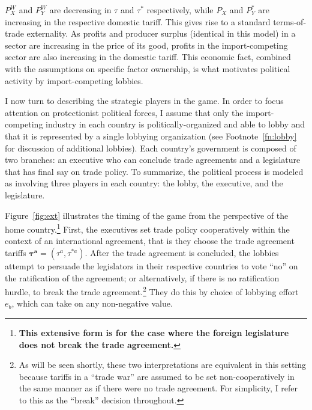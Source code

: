 \documentclass[10pt]{article}
\newcommand{\bta}{\bm{\tau^a}}
\begin{document}
$P_X^W$ and $P_Y^W$ are decreasing in $\tau$ and $\tau^*$ respectively, while $P_X$ and $P_Y^*$ are increasing in the respective domestic tariff. This gives rise to a standard terms-of-trade externality. As profits and producer surplus (identical in this model) in a sector are increasing in the price of its good, profits in the import-competing sector are also increasing in the domestic tariff. This economic fact, combined with the assumptions on specific factor ownership, is what motivates political activity by import-competing lobbies.

I now turn to describing the strategic players in the game. In order to focus attention on protectionist political forces, I assume that only the import-competing industry in each country is politically-organized and able to lobby and that it is represented by a single lobbying organization (see Footnote~\ref{fn:lobby} for discussion of additional lobbies). Each country's government is composed of two branches: an executive who can conclude trade agreements and a legislature that has final say on trade policy. To summarize, the political process is modeled as involving three players in each country: the lobby, the executive, and the legislature.

Figure~\ref{fig:ext} illustrates the timing of the game from the perspective of the home country.\footnote{\textbf{This extensive form is for the case where the foreign legislature does not break the trade agreement.}} First, the executives set trade policy cooperatively within the context of an international agreement, that is they choose the trade agreement tariffs $\bta = \left(\tau^a,\tau^{*a}\right)$. After the trade agreement is concluded, the lobbies attempt to persuade the legislators in their respective countries to vote ``no'' on the ratification of the agreement; or alternatively, if there is no ratification hurdle, to break the trade agreement.\footnote{As will be seen shortly, these two interpretations are equivalent in this setting because tariffs in a ``trade war'' are assumed to be set non-cooperatively in the same manner as if there were no trade agreement. For simplicity, I refer to this as the ``break'' decision throughout.} They do this by choice of lobbying effort $e_b$, which can take on any non-negative value.
\end{document}
